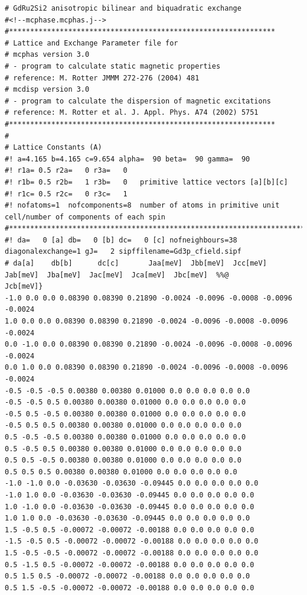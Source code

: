 {\footnotesize
\begin{verbatim}
# GdRu2Si2 anisotropic bilinear and biquadratic exchange 
#<!--mcphase.mcphas.j-->
#***************************************************************
# Lattice and Exchange Parameter file for
# mcphas version 3.0
# - program to calculate static magnetic properties
# reference: M. Rotter JMMM 272-276 (2004) 481
# mcdisp version 3.0
# - program to calculate the dispersion of magnetic excitations
# reference: M. Rotter et al. J. Appl. Phys. A74 (2002) 5751
#***************************************************************
#
# Lattice Constants (A)
#! a=4.165 b=4.165 c=9.654 alpha=  90 beta=  90 gamma=  90
#! r1a= 0.5 r2a=   0 r3a=   0
#! r1b= 0.5 r2b=   1 r3b=   0   primitive lattice vectors [a][b][c]
#! r1c= 0.5 r2c=   0 r3c=   1
#! nofatoms=1  nofcomponents=8  number of atoms in primitive unit cell/number of components of each spin
#****************************************************************************}
#! da=   0 [a] db=   0 [b] dc=   0 [c] nofneighbours=38 diagonalexchange=1 gJ=   2 sipffilename=Gd3p_cfield.sipf
# da[a]    db[b]      dc[c]       Jaa[meV]  Jbb[meV]  Jcc[meV]  Jab[meV]  Jba[meV]  Jac[meV]  Jca[meV]  Jbc[meV]  %%@
Jcb[meV]} 
-1.0 0.0 0.0 0.08390 0.08390 0.21890 -0.0024 -0.0096 -0.0008 -0.0096 -0.0024 
1.0 0.0 0.0 0.08390 0.08390 0.21890 -0.0024 -0.0096 -0.0008 -0.0096 -0.0024 
0.0 -1.0 0.0 0.08390 0.08390 0.21890 -0.0024 -0.0096 -0.0008 -0.0096 -0.0024 
0.0 1.0 0.0 0.08390 0.08390 0.21890 -0.0024 -0.0096 -0.0008 -0.0096 -0.0024 
-0.5 -0.5 -0.5 0.00380 0.00380 0.01000 0.0 0.0 0.0 0.0 0.0 
-0.5 -0.5 0.5 0.00380 0.00380 0.01000 0.0 0.0 0.0 0.0 0.0 
-0.5 0.5 -0.5 0.00380 0.00380 0.01000 0.0 0.0 0.0 0.0 0.0 
-0.5 0.5 0.5 0.00380 0.00380 0.01000 0.0 0.0 0.0 0.0 0.0 
0.5 -0.5 -0.5 0.00380 0.00380 0.01000 0.0 0.0 0.0 0.0 0.0 
0.5 -0.5 0.5 0.00380 0.00380 0.01000 0.0 0.0 0.0 0.0 0.0 
0.5 0.5 -0.5 0.00380 0.00380 0.01000 0.0 0.0 0.0 0.0 0.0 
0.5 0.5 0.5 0.00380 0.00380 0.01000 0.0 0.0 0.0 0.0 0.0 
-1.0 -1.0 0.0 -0.03630 -0.03630 -0.09445 0.0 0.0 0.0 0.0 0.0 
-1.0 1.0 0.0 -0.03630 -0.03630 -0.09445 0.0 0.0 0.0 0.0 0.0 
1.0 -1.0 0.0 -0.03630 -0.03630 -0.09445 0.0 0.0 0.0 0.0 0.0 
1.0 1.0 0.0 -0.03630 -0.03630 -0.09445 0.0 0.0 0.0 0.0 0.0 
1.5 -0.5 0.5 -0.00072 -0.00072 -0.00188 0.0 0.0 0.0 0.0 0.0 
-1.5 -0.5 0.5 -0.00072 -0.00072 -0.00188 0.0 0.0 0.0 0.0 0.0 
1.5 -0.5 -0.5 -0.00072 -0.00072 -0.00188 0.0 0.0 0.0 0.0 0.0 
0.5 -1.5 0.5 -0.00072 -0.00072 -0.00188 0.0 0.0 0.0 0.0 0.0 
0.5 1.5 0.5 -0.00072 -0.00072 -0.00188 0.0 0.0 0.0 0.0 0.0 
0.5 1.5 -0.5 -0.00072 -0.00072 -0.00188 0.0 0.0 0.0 0.0 0.0 

\end{verbatim}}
